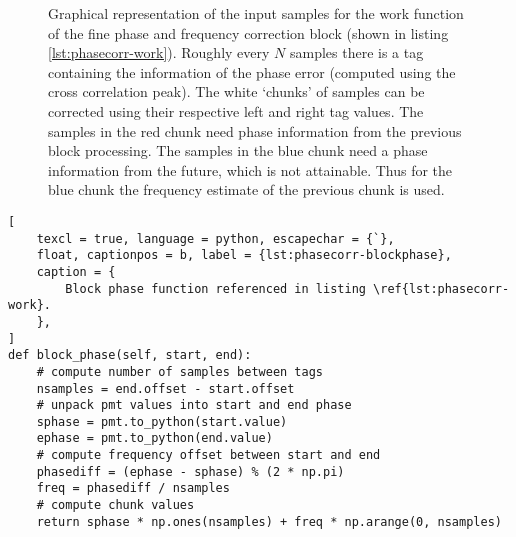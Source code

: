 \begin{figure}
	\centering
	\caption{
		Graphical representation of the input samples for the work function of the fine phase and frequency correction block (shown in listing \ref{lst:phasecorr-work}). Roughly every \(N\) samples there is a tag containing the information of the phase error (computed using the cross correlation peak). The white `chunks' of samples can be corrected using their respective left and right tag values. The samples in the red chunk need phase information from the previous block processing. The samples in the blue chunk need a phase information from the future, which is not attainable. Thus for the blue chunk the frequency estimate of the previous chunk is used.
		\label{fig:phasecorr-chunks}
	}
\end{figure}

\begin{lstlisting}[
	texcl = true, language = python, escapechar = {`},
	float, captionpos = b, label = {lst:phasecorr-blockphase},
	caption = {
		Block phase function referenced in listing \ref{lst:phasecorr-work}.
	},
]
def block_phase(self, start, end):
	# compute number of samples between tags
	nsamples = end.offset - start.offset
	# unpack pmt values into start and end phase
	sphase = pmt.to_python(start.value)
	ephase = pmt.to_python(end.value)
	# compute frequency offset between start and end
	phasediff = (ephase - sphase) % (2 * np.pi)
	freq = phasediff / nsamples
	# compute chunk values
	return sphase * np.ones(nsamples) + freq * np.arange(0, nsamples)
\end{lstlisting}

